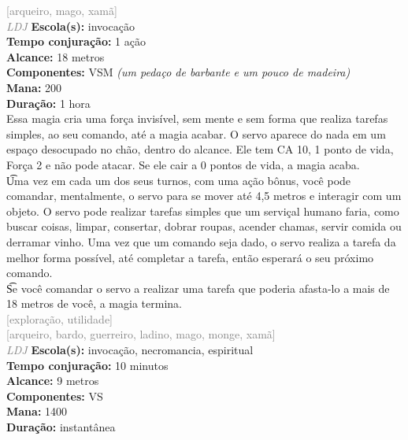 \documentclass{RPG_Adventure}[2021/10/20]
\begin{document}
{\scriptsize \textcolor{gray}{[arqueiro, mago, xamã]\\}}
{\tiny \textcolor{gray}{\textit{LDJ}}}\jump{}
{\small \t \textbf{Escola(s):} invocação\\\t \textbf{Tempo conjuração:} 1 ação\\\t \textbf{Alcance:} 18 metros\\\t \textbf{Componentes:} VSM \textit{(um pedaço de barbante e um pouco de madeira)}\\\t \textbf{Mana:} 200\\\t \textbf{Duração:} 1 hora\\}
{\normalsize Essa magia cria uma força invisível, sem mente e sem forma que realiza tarefas simples, ao seu comando, até a magia acabar. O servo aparece do nada em um espaço desocupado no chão, dentro do alcance. Ele tem CA 10, 1 ponto de vida, Força 2 e não pode atacar. Se ele cair a 0 pontos de vida, a magia acaba.\\\t Uma vez em cada um dos seus turnos, com uma ação bônus, você pode comandar, mentalmente, o servo para se mover até 4,5 metros e interagir com um objeto. O servo pode realizar tarefas simples que um serviçal humano faria, como buscar coisas, limpar, consertar, dobrar roupas, acender chamas, servir comida ou derramar vinho. Uma vez que um comando seja dado, o servo realiza a tarefa da melhor forma possível, até completar a tarefa, então esperará o seu próximo comando.\\\t Se você comandar o servo a realizar uma tarefa que poderia afasta-lo a mais de 18 metros de você, a magia termina.\\}
{\scriptsize \textcolor{gray}{[exploração, utilidade]\\}}
{\scriptsize \textcolor{gray}{[arqueiro, bardo, guerreiro, ladino, mago, monge, xamã]\\}}
{\tiny \textcolor{gray}{\textit{LDJ}}}\jump{}
{\small \t \textbf{Escola(s):} invocação, necromancia, espiritual\\\t \textbf{Tempo conjuração:} 10 minutos\\\t \textbf{Alcance:} 9 metros\\\t \textbf{Componentes:} VS\\\t \textbf{Mana:} 1400\\\t \textbf{Duração:} instantânea\\}
\end{document}
